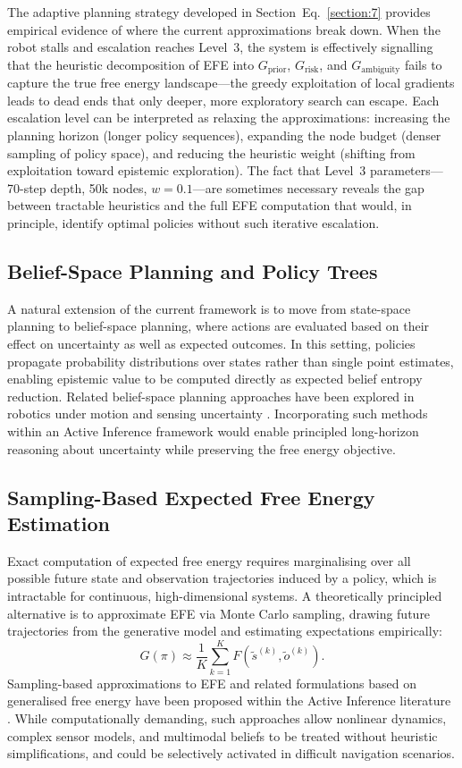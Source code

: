 \documentclass[a4paper, twoside]{article}
\begin{document}
The adaptive planning strategy developed in Section~Eq.~\ref{section:7} provides empirical evidence of 
where the current approximations break down. When the robot stalls and escalation reaches Level~3, 
the system is effectively signalling that the heuristic decomposition of EFE into $G_{\text{prior}}$, 
$G_{\text{risk}}$, and $G_{\text{ambiguity}}$ fails to capture the true free energy landscape---the 
greedy exploitation of local gradients leads to dead ends that only deeper, more exploratory search 
can escape. Each escalation level can be interpreted as relaxing the approximations: increasing the 
planning horizon (longer policy sequences), expanding the node budget (denser sampling of policy 
space), and reducing the heuristic weight (shifting from exploitation toward epistemic exploration). 
The fact that Level~3 parameters---70-step depth, 50k nodes, $w=0.1$---are sometimes necessary 
reveals the gap between tractable heuristics and the full EFE computation that would, in principle, 
identify optimal policies without such iterative escalation.

\subsection{Belief-Space Planning and Policy Trees}

A natural extension of the current framework is to move from state-space planning to belief-space planning, where actions are evaluated based on their effect on uncertainty as well as expected outcomes. In this setting, policies propagate probability distributions over states rather than single point estimates, enabling epistemic value to be computed directly as expected belief entropy reduction. Related belief-space planning approaches have been explored in robotics under motion and sensing uncertainty \cite{platt2010belief, vandenberg2012lqgmp}. Incorporating such methods within an Active Inference framework would enable principled long-horizon reasoning about uncertainty while preserving the free energy objective.

\subsection{Sampling-Based Expected Free Energy Estimation}

Exact computation of expected free energy requires marginalising over all possible future state and observation trajectories induced by a policy, which is intractable for continuous, high-dimensional systems. A theoretically principled alternative is to approximate EFE via Monte Carlo sampling, drawing future trajectories from the generative model and estimating expectations empirically:
\[
G(\pi) \approx \frac{1}{K} \sum_{k=1}^{K} F(\tilde{s}^{(k)}, \tilde{o}^{(k)}).
\]
Sampling-based approximations to EFE and related formulations based on generalised free energy have been proposed within the Active Inference literature \cite{friston2015planning, parr2019generalised}. While computationally demanding, such approaches allow nonlinear dynamics, complex sensor models, and multimodal beliefs to be treated without heuristic simplifications, and could be selectively activated in difficult navigation scenarios.
\end{document}
